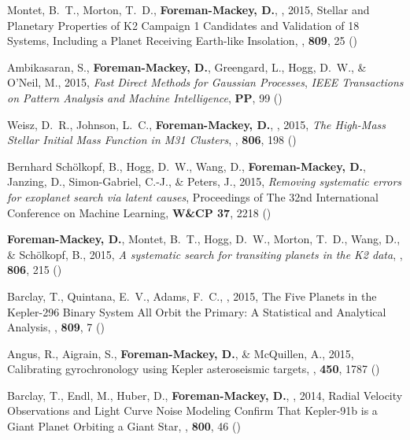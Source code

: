 \item Montet, B.~T., Morton, T.~D., {\bf Foreman-Mackey, D.}, \etal, 2015,
        {Stellar and Planetary Properties of K2 Campaign 1 Candidates and
         Validation of 18 Systems, Including a Planet Receiving Earth-like
         Insolation},
    \apj, \textbf{809}, 25 ()

\item Ambikasaran, S., {\bf Foreman-Mackey, D.}, Greengard, L., Hogg, D.~W.,
    \& O'Neil, M., 2015,
    \emph{Fast Direct Methods for Gaussian Processes},
    \emph{IEEE Transactions on Pattern Analysis and Machine Intelligence},
    {\bf PP}, 99 ()

\item Weisz, D.~R., Johnson, L.~C., {\bf Foreman-Mackey, D.}, \etal, 2015,
    \emph{The High-Mass Stellar Initial Mass Function in M31 Clusters},
    \apj, \textbf{806}, 198 ()

\item Bernhard Sch\"olkopf, B., Hogg, D.~W., Wang, D., {\bf Foreman-Mackey,
    D.}, Janzing, D., Simon-Gabriel, C.-J., \& Peters, J., 2015,
    \emph{Removing systematic errors for exoplanet search via latent causes},
    {Proceedings of The 32nd International Conference on Machine Learning},
    \textbf{W\&CP 37}, 2218 ()

\item {\bf Foreman-Mackey, D.}, Montet, B.~T., Hogg, D.~W., Morton, T.~D.,
    Wang, D., \& Sch\"olkopf, B., 2015,
    \emph{A systematic search for transiting planets in the K2 data},
    \apj, \textbf{806}, 215 ()

\item Barclay, T., Quintana, E.~V., Adams, F.~C., \etal, 2015,
        {The Five Planets in the Kepler-296 Binary System All Orbit the
         Primary: A Statistical and Analytical Analysis},
    \apj, \textbf{809}, 7 ()

\item Angus, R., Aigrain, S., {\bf Foreman-Mackey, D.}, \& McQuillen, A., 2015,
        {Calibrating gyrochronology using Kepler asteroseismic targets},
    \mnras, \textbf{450}, 1787 ()

\item Barclay, T., Endl, M.,  Huber, D., {\bf Foreman-Mackey, D.}, \etal, 2014,
        {Radial Velocity Observations and Light Curve Noise Modeling Confirm
         That Kepler-91b is a Giant Planet Orbiting a Giant Star},
    \apj, \textbf{800}, 46 ()

